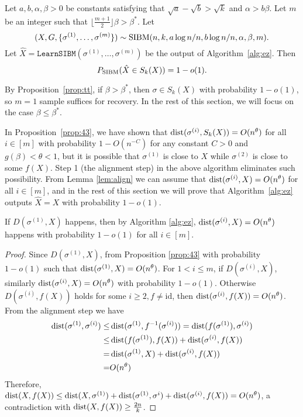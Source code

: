 \documentclass{article}
\begin{document}
\begin{proposition} \label{prop:nr}
	Let $a,b,\alpha,\beta> 0$ be constants satisfying that $\sqrt{a}-\sqrt{b} > \sqrt{k}$ and $\alpha>b\beta$.
	Let $m$ be an integer such that $\lfloor \frac{m + 1}{2} \rfloor \beta>\beta^\ast$.
	Let 
	$$
	(X,G,\{\sigma^{(1)},\dots,\sigma^{(m)}\})\sim \operatorname{SIBM}(n,k, a\log n/n, b\log n/n,\alpha,\beta, m) .
	$$
	Let $\hat{X}=\texttt{LearnSIBM}(\sigma^{(1)},\dots,\sigma^{(m)})$ be the output of Algorithm~\ref{alg:ez}. Then
	$$
	P_{\operatorname{SIBM}}(\hat{X} \in S_k(X)) = 1-o(1) .
	$$
\end{proposition}

By Proposition~\ref{prop:tt},
if $\beta>\beta^\ast$, then $\sigma \in S_k(X) $ with probability $1-o(1)$, so $m=1$ sample suffices for recovery.
In the rest of this section, we will focus on the case $\beta\le \beta^\ast$.

In Proposition~\ref{prop:43},
we have shown that $\operatorname{dist}(\sigma^{(i)}, S_k(X)) =O(n^{\theta})$
for all $i\in[m]$ with probability $1-O(n^{-C})$ for any constant $C>0$ and $g(\beta) < \theta < 1$,
but it is possible that $\sigma^{(1)}$ is close to $X$ while $\sigma^{(2)}$ is close to some $f(X)$.
Step 1 (the alignment step) in the above algorithm eliminates such possibility. From Lemma \ref{lem:align}
we can assume that
$\operatorname{dist}(\sigma^{(i)}, X) = O(n^{\theta})$ for all $i\in[m]$,
and in the rest of this section we will prove that Algorithm~\ref{alg:ez} outputs $\hat{X}=X$ with probability $1-o(1)$.
\begin{lemma}\label{lem:align}
	If $D(\sigma^{(1)}, X)$ happens, then by Algorithm \ref{alg:ez}, $\operatorname{dist}(\sigma^{(i)}, X) = O(n^{\theta})$ happens with probability $1-o(1)$ for all $i\in[m]$.
\end{lemma}
\begin{proof}
	Since $D(\sigma^{(1)}, X)$, from Proposition \ref{prop:43} with probability $1-o(1)$ such that $\operatorname{dist}(\sigma^{(1)}, X) = O(n^{\theta})$.
	For $1<i\leq m$, if $D(\sigma^{(i)}, X)$, similarly $\operatorname{dist}(\sigma^{(i)}, X) = O(n^{\theta})$ with probability $1-o(1)$.
	Otherwise $D(\sigma^{(i)}, f(X))$ holds for some $i\geq 2, f \neq \mathrm{id}$, then $\operatorname{dist}(\sigma^{(i)}, f(X)) = O(n^{\theta})$.
	From the alignment step we have
	\begin{align*}
	\operatorname{dist}(\sigma^{(1)}, \sigma^{(i)}) \leq & \operatorname{dist}(\sigma^{(1)}, f^{-1}(\sigma^{(i)})) = \operatorname{dist}(f(\sigma^{(1)}), \sigma^{(i)}) \\
	\leq & \operatorname{dist}(f(\sigma^{(1)}), f(X)) + \operatorname{dist}(\sigma^{(i)}, f(X)) \\
	= & \operatorname{dist}(\sigma^{(1)}, X) + \operatorname{dist}(\sigma^{(i)}, f(X)) \\
	= & O(n^{\theta})
	\end{align*}
	Therefore,
	$\operatorname{dist}(X, f(X)) \leq \operatorname{dist}(X, \sigma^{(1)}) + \operatorname{dist}(\sigma^{(1)}, \sigma^{i}) + \operatorname{dist}(\sigma^{(i)}, f(X)) = O(n^{\theta})$,
	a contradiction with $\operatorname{dist}(X, f(X))\geq \frac{2n}{k}$.
\end{proof}
\end{document}
